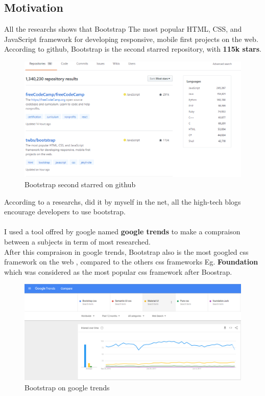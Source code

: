 \documentclass[12pt]{article}
\begin{document}
	\subsection{Motivation}
	All the researchs shows that Bootstrap The most popular HTML, CSS, and JavaScript framework for developing responsive, mobile first projects on the web.
	\\
	According to github, Bootstrap is the second starred repository, with \textbf{115k stars}.
	\begin{figure}[h]
		\centering
		\includegraphics[width=1\textwidth]{Boostrap_statics_github.png}
		\caption{Bootstrap second starred on github}
	\end{figure}
	
	\vspace{66mm}
	
	According to a researchs, did it by myself in the net, all the high-tech blogs encourage developers to use bootstrap.
	\\
	\\
	I used a tool offred by google named \textbf{google trends} to make a compraison between a subjects in term of most researched.
	\\
	After this compraison in google trends, Bootstrap also is the most googled css framework on the web , compared to the others css frameworks Eg. \textbf{Foundation} which was considered as the most popular css framework after Boostrap.
	\begin{figure}[h]
		\centering
		\includegraphics[width=1\textwidth]{Boostrap_statics_google_trends.png}
		\caption{Bootstrap on google trends}
	\end{figure}
\end{document}
